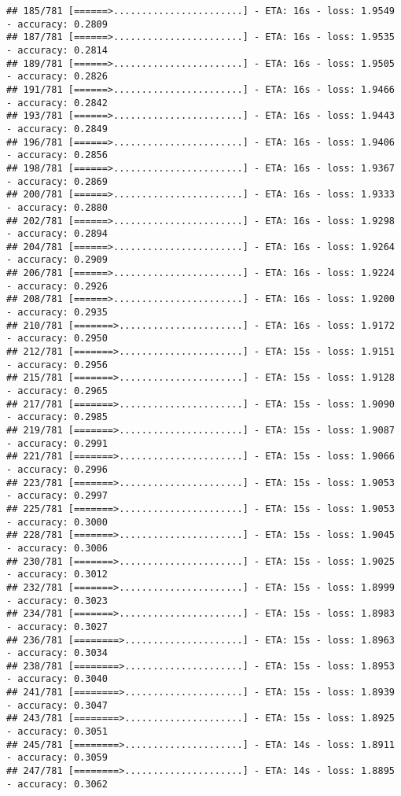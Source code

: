 \documentclass[
]{article}
\begin{document}
\begin{verbatim}
## 185/781 [======>.......................] - ETA: 16s - loss: 1.9549 - accuracy: 0.2809
## 187/781 [======>.......................] - ETA: 16s - loss: 1.9535 - accuracy: 0.2814
## 189/781 [======>.......................] - ETA: 16s - loss: 1.9505 - accuracy: 0.2826
## 191/781 [======>.......................] - ETA: 16s - loss: 1.9466 - accuracy: 0.2842
## 193/781 [======>.......................] - ETA: 16s - loss: 1.9443 - accuracy: 0.2849
## 196/781 [======>.......................] - ETA: 16s - loss: 1.9406 - accuracy: 0.2856
## 198/781 [======>.......................] - ETA: 16s - loss: 1.9367 - accuracy: 0.2869
## 200/781 [======>.......................] - ETA: 16s - loss: 1.9333 - accuracy: 0.2880
## 202/781 [======>.......................] - ETA: 16s - loss: 1.9298 - accuracy: 0.2894
## 204/781 [======>.......................] - ETA: 16s - loss: 1.9264 - accuracy: 0.2909
## 206/781 [======>.......................] - ETA: 16s - loss: 1.9224 - accuracy: 0.2926
## 208/781 [======>.......................] - ETA: 16s - loss: 1.9200 - accuracy: 0.2935
## 210/781 [=======>......................] - ETA: 16s - loss: 1.9172 - accuracy: 0.2950
## 212/781 [=======>......................] - ETA: 15s - loss: 1.9151 - accuracy: 0.2956
## 215/781 [=======>......................] - ETA: 15s - loss: 1.9128 - accuracy: 0.2965
## 217/781 [=======>......................] - ETA: 15s - loss: 1.9090 - accuracy: 0.2985
## 219/781 [=======>......................] - ETA: 15s - loss: 1.9087 - accuracy: 0.2991
## 221/781 [=======>......................] - ETA: 15s - loss: 1.9066 - accuracy: 0.2996
## 223/781 [=======>......................] - ETA: 15s - loss: 1.9053 - accuracy: 0.2997
## 225/781 [=======>......................] - ETA: 15s - loss: 1.9053 - accuracy: 0.3000
## 228/781 [=======>......................] - ETA: 15s - loss: 1.9045 - accuracy: 0.3006
## 230/781 [=======>......................] - ETA: 15s - loss: 1.9025 - accuracy: 0.3012
## 232/781 [=======>......................] - ETA: 15s - loss: 1.8999 - accuracy: 0.3023
## 234/781 [=======>......................] - ETA: 15s - loss: 1.8983 - accuracy: 0.3027
## 236/781 [========>.....................] - ETA: 15s - loss: 1.8963 - accuracy: 0.3034
## 238/781 [========>.....................] - ETA: 15s - loss: 1.8953 - accuracy: 0.3040
## 241/781 [========>.....................] - ETA: 15s - loss: 1.8939 - accuracy: 0.3047
## 243/781 [========>.....................] - ETA: 15s - loss: 1.8925 - accuracy: 0.3051
## 245/781 [========>.....................] - ETA: 14s - loss: 1.8911 - accuracy: 0.3059
## 247/781 [========>.....................] - ETA: 14s - loss: 1.8895 - accuracy: 0.3062

\end{verbatim}
\end{document}
